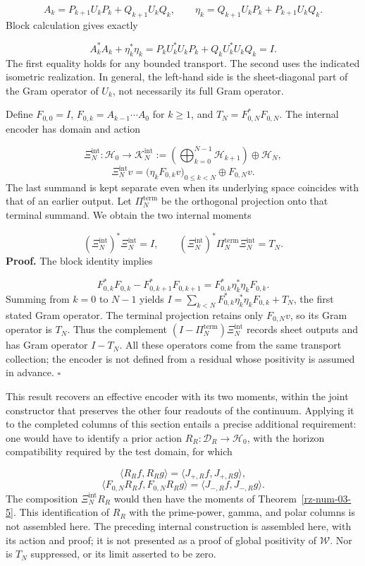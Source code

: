 \[
A_k=P_{k+1}U_kP_k+Q_{k+1}U_kQ_k,
\qquad
\eta_k=Q_{k+1}U_kP_k+P_{k+1}U_kQ_k.
\]
Block calculation gives exactly

\[
A_k^*A_k+\eta_k^*\eta_k
=P_kU_k^*U_kP_k+Q_kU_k^*U_kQ_k=I.
\]
The first equality holds for any bounded transport. The second uses the indicated isometric realization. In general, the left-hand side is the sheet-diagonal part of the Gram operator of \(U_k\), not necessarily its full Gram operator.

Define \(F_{0,0}=I\), \(F_{0,k}=A_{k-1}\cdots A_0\) for \(k\geq1\), and \(T_N=F_{0,N}^*F_{0,N}\). The internal encoder has domain and action

\[
\Xi_N^{\mathrm{int}}:\mathscr H_0\longrightarrow
\mathscr K_N^{\mathrm{int}}
:=\left(\bigoplus_{k=0}^{N-1}\mathscr H_{k+1}\right)\oplus\mathscr H_N,
\]
\[
\Xi_N^{\mathrm{int}}v
=\bigl(\eta_kF_{0,k}v\bigr)_{0\leq k<N}\oplus F_{0,N}v.
\]
The last summand is kept separate even when its underlying space coincides with that of an earlier output. Let \(\Pi_N^{\mathrm{term}}\) be the orthogonal projection onto that terminal summand. We obtain the two internal moments

\[
(\Xi_N^{\mathrm{int}})^*\Xi_N^{\mathrm{int}}=I,
\qquad
(\Xi_N^{\mathrm{int}})^*\Pi_N^{\mathrm{term}}\Xi_N^{\mathrm{int}}=T_N.
\]
\textbf{Proof.} The block identity implies

\[
F_{0,k}^*F_{0,k}-F_{0,k+1}^*F_{0,k+1}
=F_{0,k}^*\eta_k^*\eta_kF_{0,k}.
\]
Summing from \(k=0\) to \(N-1\) yields \(I=\sum_{k<N}F_{0,k}^*\eta_k^*\eta_kF_{0,k}+T_N\), the first stated Gram operator. The terminal projection retains only \(F_{0,N}v\), so its Gram operator is \(T_N\). Thus the complement \((I-\Pi_N^{\mathrm{term}})\Xi_N^{\mathrm{int}}\) records sheet outputs and has Gram operator \(I-T_N\). All these operators come from the same transport collection; the encoder is not defined from a residual whose positivity is assumed in advance. \hfill\(\square\)

This result recovers an effective encoder with its two moments, within the joint constructor that preserves the other four readouts of the continuum. Applying it to the completed columns of this section entails a precise additional requirement: one would have to identify a prior action \(R_R:\mathcal D_R\to\mathscr H_0\), with the horizon compatibility required by the test domain, for which

\[
\langle R_Rf,R_Rg\rangle
=\langle J_{+,R}f,J_{+,R}g\rangle,
\]
\[
\langle F_{0,N}R_Rf,F_{0,N}R_Rg\rangle
=\langle J_{-,R}f,J_{-,R}g\rangle.
\]
The composition \(\Xi_N^{\mathrm{int}}R_R\) would then have the moments of Theorem~\ref{rz-num-03-5}. This identification of \(R_R\) with the prime-power, gamma, and polar columns is not assembled here. The preceding internal construction is assembled here, with its action and proof; it is not presented as a proof of global positivity of \(\mathscr W\). Nor is \(T_N\) suppressed, or its limit asserted to be zero.

